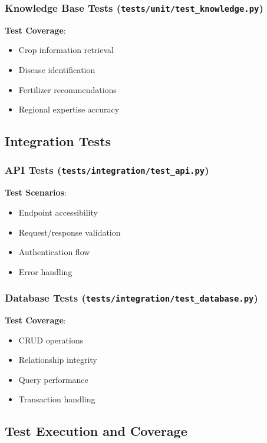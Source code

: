 \documentclass[12pt,a4paper]{article}
\begin{document}
\subsubsection{Knowledge Base Tests (\texttt{tests/unit/test\_knowledge.py})}

\textbf{Test Coverage}:
\begin{itemize}[leftmargin=*]
    \item Crop information retrieval
    \item Disease identification
    \item Fertilizer recommendations
    \item Regional expertise accuracy
\end{itemize}

\subsection{Integration Tests}

\subsubsection{API Tests (\texttt{tests/integration/test\_api.py})}

\textbf{Test Scenarios}:
\begin{itemize}[leftmargin=*]
    \item Endpoint accessibility
    \item Request/response validation
    \item Authentication flow
    \item Error handling
\end{itemize}

\subsubsection{Database Tests (\texttt{tests/integration/test\_database.py})}

\textbf{Test Coverage}:
\begin{itemize}[leftmargin=*]
    \item CRUD operations
    \item Relationship integrity
    \item Query performance
    \item Transaction handling
\end{itemize}

\subsection{Test Execution and Coverage}
\end{document}
